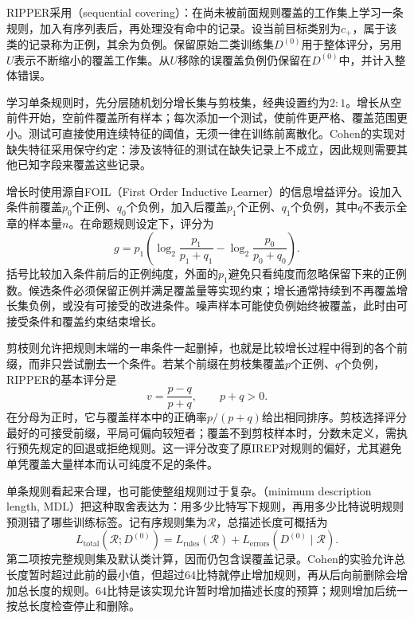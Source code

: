 RIPPER采用（sequential covering）：在尚未被前面规则覆盖的工作集上学习一条规则，加入有序列表后，再处理没有命中的记录。设当前目标类别为$c_+$，属于该类的记录称为正例，其余为负例。保留原始二类训练集$D^{(0)}$用于整体评分，另用$U$表示不断缩小的覆盖工作集。从$U$移除的误覆盖负例仍保留在$D^{(0)}$中，并计入整体错误。

学习单条规则时，先分层随机划分增长集与剪枝集，经典设置约为$2:1$。增长从空前件开始，空前件覆盖所有样本；每次添加一个测试，使前件更严格、覆盖范围更小。测试可直接使用连续特征的阈值，无须一律在训练前离散化。Cohen的实现对缺失特征采用保守约定：涉及该特征的测试在缺失记录上不成立，因此规则需要其他已知字段来覆盖这些记录。

增长时使用源自FOIL（First Order Inductive Learner）的信息增益评分。设加入条件前覆盖$p_0$个正例、$q_0$个负例，加入后覆盖$p_1$个正例、$q_1$个负例，其中$q$不表示全章的样本量$n$。在命题规则设定下，评分为
\begin{equation}
  g=p_1\left(
  \log_2\frac{p_1}{p_1+q_1}
  -\log_2\frac{p_0}{p_0+q_0}
  \right).
  \label{eq:classification-foil-gain}
\end{equation}
括号比较加入条件前后的正例纯度，外面的$p_1$避免只看纯度而忽略保留下来的正例数。候选条件必须保留正例并满足覆盖量等实现约束；增长通常持续到不再覆盖增长集负例，或没有可接受的改进条件。噪声样本可能使负例始终被覆盖，此时由可接受条件和覆盖约束结束增长。

剪枝则允许把规则末端的一串条件一起删掉，也就是比较增长过程中得到的各个前缀，而非只尝试删去一个条件。若某个前缀在剪枝集覆盖$p$个正例、$q$个负例，RIPPER的基本评分是
\begin{equation}
  v=\frac{p-q}{p+q},\qquad p+q>0.
  \label{eq:classification-ripper-pruning}
\end{equation}
在分母为正时，它与覆盖样本中的正确率$p/(p+q)$给出相同排序。剪枝选择评分最好的可接受前缀，平局可偏向较短者；覆盖不到剪枝样本时，分数未定义，需执行预先规定的回退或拒绝规则。这一评分改变了原IREP对规则的偏好，尤其避免单凭覆盖大量样本而认可纯度不足的条件。

单条规则看起来合理，也可能使整组规则过于复杂。（minimum description length, MDL）把这种取舍表达为：用多少比特写下规则，再用多少比特说明规则预测错了哪些训练标签。记有序规则集为$\mathcal{R}$，总描述长度可概括为
\begin{equation}
  L_{\mathrm{total}}(\mathcal{R};D^{(0)})
  =L_{\mathrm{rules}}(\mathcal{R})
   +L_{\mathrm{errors}}(D^{(0)}\mid\mathcal{R}).
  \label{eq:classification-rule-description-length}
\end{equation}
第二项按完整规则集及默认类计算，因而仍包含误覆盖记录。Cohen的实验允许总长度暂时超过此前的最小值，但超过64比特就停止增加规则，再从后向前删除会增加总长度的规则。64比特是该实现允许暂时增加描述长度的预算；规则增加后统一按总长度检查停止和删除。

